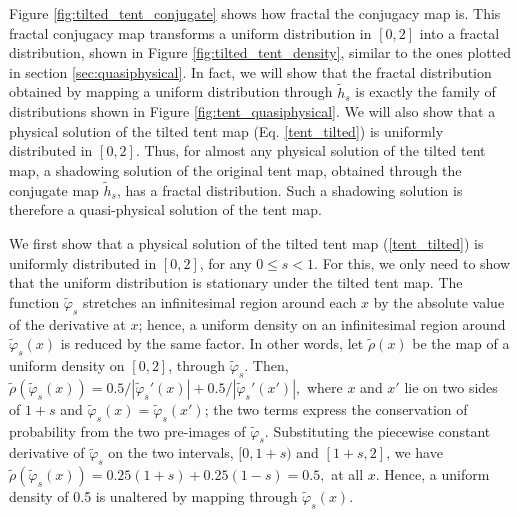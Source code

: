 Figure \ref{fig:tilted_tent_conjugate} shows how fractal the conjugacy map is.
This fractal conjugacy map transforms a uniform distribution in $[0,2]$ into
a fractal distribution, shown in Figure \ref{fig:tilted_tent_density},
similar to the ones plotted in section \ref{sec:quasiphysical}.
In fact, we will show that the fractal distribution obtained by mapping a uniform
distribution through $\tilde{h}_s$ is exactly the family of distributions
shown in Figure \ref{fig:tent_quasiphysical}.  We will also show that
a physical solution of the tilted tent map (Eq. \ref{tent_tilted}) is uniformly
distributed in $[0,2]$.  Thus, for almost any physical solution of the
tilted tent map, a shadowing solution of the original tent map, obtained
through the conjugate map $\tilde{h}_s$, has a fractal distribution.
Such a shadowing solution is therefore a quasi-physical solution of
the tent map.

We first show that a physical solution of the tilted tent map 
(\ref{tent_tilted}) is uniformly distributed in $[0,2]$, for
any $0\le s<1$. For this, we only need to show that the uniform
distribution is stationary under the tilted tent map.
The function $\tilde{\varphi}_s$ stretches an infinitesimal
region around each $x$ by the absolute value of the derivative at $x$; 
hence, a uniform density on an infinitesimal region around $\tilde{\varphi}_s(x)$ 
is reduced by the same factor. In other words, let $\tilde{\rho}(x)$ 
be the map of a uniform density on $[0,2]$, through $\tilde{\varphi}_s$. Then, 
$\tilde{\rho}(\tilde{\varphi}_s (x)) = 0.5/|\tilde \varphi_s'(x)| + 0.5/|\tilde \varphi_s'(x')|,$ where
$x$ and $x'$ lie on two sides of $1+s$ and
$\tilde{\varphi}_s(x)=\tilde{\varphi}_s(x')$; the two terms express the conservation of probability 
from the two pre-images of $\tilde{\varphi}_s$. Substituting the piecewise constant 
derivative of $\tilde{\varphi}_s$ on the two intervals, $[0,1+s)$ and $[1+s,2]$,
we have $\tilde{\rho}(\tilde{\varphi}_s (x)) = 0.25(1+s) + 0.25(1-s) = 0.5,$ at 
all $x.$ Hence, a uniform density of 0.5 is unaltered by mapping through 
$\tilde\varphi_s(x)$.

